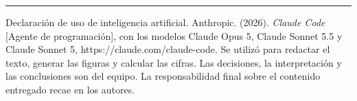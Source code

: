 \documentclass[10pt]{article}
\newcommand{\serif}{\fontfamily{bch}\selectfont}
\newlength{\colh}
\begin{document}
\begin{minipage}[t][\colh][s]{0.30\linewidth}
\end{minipage}

\vfill
{\color{olive}\rule{\linewidth}{2.5pt}}
\vspace{0.3cm}

\noindent
{\fontsize{18}{23}\selectfont\color{ink}
{\serif\color{olivedark}\fontsize{22}{28}\selectfont Declaración de uso de inteligencia artificial.}
Anthropic. (2026). \emph{Claude Code} [Agente de programación], con los modelos Claude Opus 5, Claude Sonnet 5.5 y Claude Sonnet 5, https://claude.com/claude-code. Se utilizó para redactar el texto, generar las figuras y calcular las cifras. Las decisiones, la interpretación y las conclusiones son del equipo.
La responsabilidad final sobre el contenido entregado recae en los autores.\par}
\end{document}
